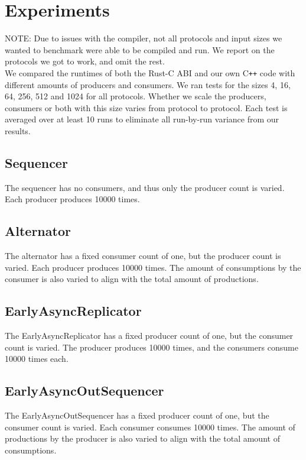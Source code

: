 \section{Experiments}
NOTE: Due to issues with the compiler, not all protocols and input sizes we wanted to benchmark were able to be compiled and run. We report on the protocols we got to work, and omit the rest. \\

\noindent We compared the runtimes of both the Rust-C ABI and our own C\texttt{++} code with different amounts of producers and consumers. We ran tests for the sizes 4, 16, 64, 256, 512 and 1024 for all protocols. Whether we scale the producers, consumers or both with this size varies from protocol to protocol. Each test is averaged over at least 10 runs to eliminate all run-by-run variance from our results.

\subsection{Sequencer}
The sequencer has no consumers, and thus only the producer count is varied. Each producer produces 10000 times.

\subsection{Alternator}
The alternator has a fixed consumer count of one, but the producer count is varied. Each producer produces 10000 times. The amount of consumptions by the consumer is also varied to align with the total amount of productions.

\subsection{EarlyAsyncReplicator}
The EarlyAsyncReplicator has a fixed producer count of one, but the consumer count is varied. The producer produces 10000 times, and the consumers consume 10000 times each.

\subsection{EarlyAsyncOutSequencer}
The EarlyAsyncOutSequencer has a fixed producer count of one, but the consumer count is varied. Each consumer consumes 10000 times. The amount of productions by the producer is also varied to align with the total amount of consumptions.


